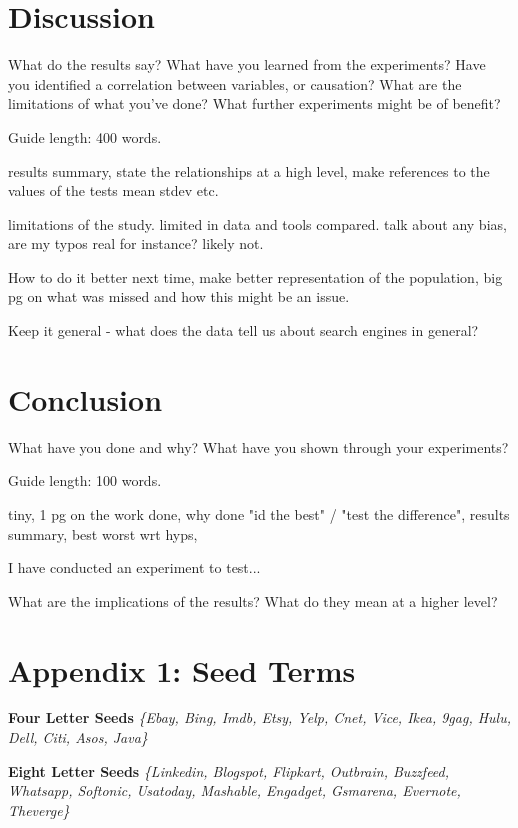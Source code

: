 \documentclass{csfourzero}
\begin{document}
\section{Discussion}
\label{sec:discuss}

What do the results say? What have you learned from the
experiments? Have you identified a correlation between variables, or
causation? What are the limitations of what you've done? What further
experiments might be of benefit?

Guide length: 400 words.

results summary, state the relationships at a high level, make references to the values of the tests mean stdev etc.

limitations of the study. limited in data and tools compared. talk about any bias, are my typos real for instance? likely not.

How to do it better next time, make better representation of the population, big pg on what was missed and how this might be an issue.

Keep it general - what does the data tell us about search engines in general?

\section{Conclusion}
\label{sec:conc}

What have you done and why? What have you shown through your
experiments?

Guide length: 100 words.

tiny, 1 pg on the work done, why done "id the best" / "test the difference", results summary, best worst wrt hyps,

I have conducted an experiment to test...

What are the implications of the results? What do they mean at a higher level?

\raggedbottom


\pagebreak
\raggedbottom
\section{Appendix 1: Seed Terms}
\textbf{Four Letter Seeds}
\textit{\{Ebay, Bing, Imdb, Etsy, Yelp, Cnet, Vice, Ikea, 9gag, Hulu, Dell, Citi, Asos, Java\}}

\noindent
\textbf{Eight Letter Seeds}
\textit{\{Linkedin, Blogspot, Flipkart, Outbrain, Buzzfeed, Whatsapp, Softonic, Usatoday, Mashable, Engadget, Gsmarena, Evernote, Theverge\}}
\end{document}
